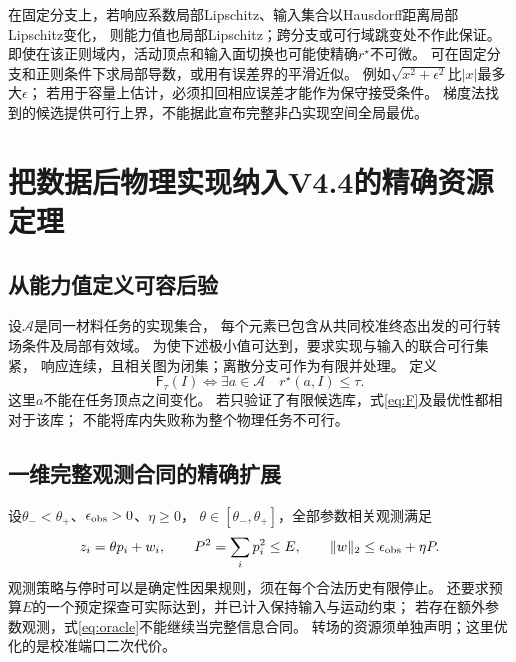 \documentclass[11pt,a4paper]{article}
\numberwithin{equation}{section}
\theoremstyle{definition}
\newcommand{\A}{\mathcal A}
\begin{document}
在固定分支上，若响应系数局部Lipschitz、输入集合以Hausdorff距离局部Lipschitz变化，
则能力值也局部Lipschitz；跨分支或可行域跳变处不作此保证。
即使在该正则域内，活动顶点和输入面切换也可能使精确$r^\star$不可微。
可在固定分支和正则条件下求局部导数，或用有误差界的平滑近似。
例如$\sqrt{x^2+\epsilon^2}$比$|x|$最多大$\epsilon$；
若用于容量上估计，必须扣回相应误差才能作为保守接受条件。
梯度法找到的候选提供可行上界，不能据此宣布完整非凸实现空间全局最优。

\section{把数据后物理实现纳入V4.4的精确资源定理}
\subsection{从能力值定义可容后验}
设$\A$是同一材料任务的实现集合，
每个元素已包含从共同校准终态出发的可行转场条件及局部有效域。
为使下述极小值可达到，要求实现与输入的联合可行集紧，
响应连续，且相关图为闭集；离散分支可作为有限并处理。
定义
\begin{equation}
 \mathsf F_\tau(I)
 \iff
 \exists a\in\A\quad r^\star(a,I)\le\tau.
 \label{eq:F}
\end{equation}
这里$a$不能在任务顶点之间变化。
若只验证了有限候选库，式\eqref{eq:F}及最优性都相对于该库；
不能将库内失败称为整个物理任务不可行。

\subsection{一维完整观测合同的精确扩展}
设$\theta_-<\theta_+$、$\epsilon_{\rm obs}>0$、$\eta\ge0$，
$\theta\in[\theta_-,\theta_+]$，全部参数相关观测满足
\begin{equation}
 z_i=\theta p_i+w_i,\qquad
 P^2=\sum_i p_i^2\le E,\qquad
 \|w\|_2\le\epsilon_{\rm obs}+\eta P.
 \label{eq:oracle}
\end{equation}
观测策略与停时可以是确定性因果规则，须在每个合法历史有限停止。
还要求预算$E$的一个预定探查可实际达到，并已计入保持输入与运动约束；
若存在额外参数观测，式\eqref{eq:oracle}不能继续当完整信息合同。
转场的资源须单独声明；这里优化的是校准端口二次代价。
\end{document}
